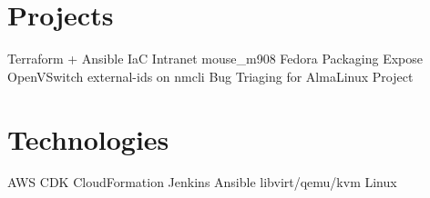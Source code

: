 \documentclass[]{friggeri-cv}
\begin{document}
\begin{aside}
  \section{Projects}
    \bullet\hspace{0.2cm}Terraform + Ansible IaC Intranet
    \bullet\hspace{0.2cm}mouse\_m908 Fedora Packaging
    \bullet\hspace{0.2cm}Expose OpenVSwitch external-ids on nmcli
    \bullet\hspace{0.2cm}Bug Triaging for AlmaLinux Project
    ~
  \section{Technologies}
    \bullet\hspace{0.2cm}AWS CDK
    \bullet\hspace{0.2cm}CloudFormation
    \bullet\hspace{0.2cm}Jenkins
    \bullet\hspace{0.2cm}Ansible
    \bullet\hspace{0.2cm}libvirt/qemu/kvm
    \bullet\hspace{0.2cm}Linux
    ~
\end{aside}
\end{document}
